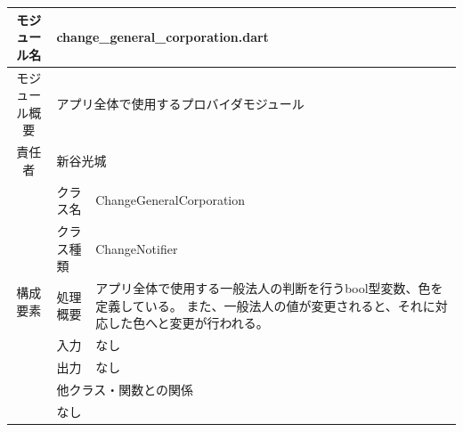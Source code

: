 \begin{table}[H]
  \centering
  \begin{tabular}{|c|l|l|} \hline
    モジュール名                & \multicolumn{2}{l|}{change\_general\_corporation.dart}                                                                   \\ \hline
    モジュール概要               & \multicolumn{2}{p{12cm}|}{アプリ全体で使用するプロバイダモジュール}                                                                          \\ \hline
    責任者                   & \multicolumn{2}{l|}{新谷光城}                                                                                                \\ \hline
    \multirow{7}{*}{構成要素} & クラス名                                                   & ChangeGeneralCorporation                                        \\ \cline{2-3}
                          & クラス種類                                                  & ChangeNotifier                                                  \\ \cline{2-3}
                          & 処理概要                                                   & \multicolumn{1}{p{12cm}|}{アプリ全体で使用する一般法人の判断を行うbool型変数、色を定義している。
    また、一般法人の値が変更されると、それに対応した色へと変更が行われる。}                                                                                                             \\ \cline{2-3}
                          & 入力                                                     & なし                                                              \\ \cline{2-3}
                          & 出力                                                     & なし                                                              \\ \cline{2-3}
                          & \multicolumn{2}{l|}{他クラス・関数との関係}                                                                                         \\ \cline{2-3}
                          & \multicolumn{2}{p{14cm}|}{なし}                                                                                            \\ \hline
  \end{tabular}
\end{table}

